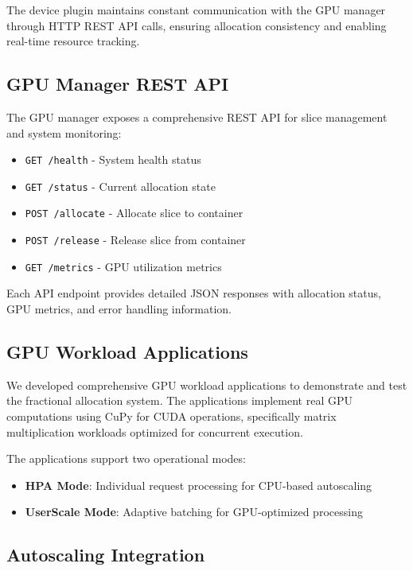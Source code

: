 \documentclass[10pt,twocolumn,letterpaper]{article}
\begin{document}
The device plugin maintains constant communication with the GPU manager through HTTP REST API calls, ensuring allocation consistency and enabling real-time resource tracking.

\subsection{GPU Manager REST API}

The GPU manager exposes a comprehensive REST API for slice management and system monitoring:

\begin{itemize}
\item \texttt{GET /health} - System health status
\item \texttt{GET /status} - Current allocation state
\item \texttt{POST /allocate} - Allocate slice to container
\item \texttt{POST /release} - Release slice from container
\item \texttt{GET /metrics} - GPU utilization metrics
\end{itemize}

Each API endpoint provides detailed JSON responses with allocation status, GPU metrics, and error handling information.

\subsection{GPU Workload Applications}

We developed comprehensive GPU workload applications to demonstrate and test the fractional allocation system. The applications implement real GPU computations using CuPy for CUDA operations, specifically matrix multiplication workloads optimized for concurrent execution.

The applications support two operational modes:
\begin{itemize}
\item \textbf{HPA Mode}: Individual request processing for CPU-based autoscaling
\item \textbf{UserScale Mode}: Adaptive batching for GPU-optimized processing
\end{itemize}

\subsection{Autoscaling Integration}
\end{document}
